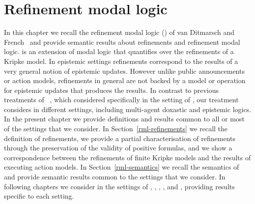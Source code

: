 \chapter{Refinement modal logic}\label{rml}

In this chapter we recall the refinement modal logic (\logicRml{}) of van Ditmarsch and French~\cite{vanditmarsch:2009} and provide semantic results about refinements and refinement modal logic.
\logicRml{} is an extension of modal logic that quantifies over the refinements of a Kripke model.
In epistemic settings refinements correspond to the results of a very general notion of epistemic updates.
However unlike public announcements or action models, refinements in general are not backed by a model or operation for epistemic updates that produces the results.  
In contrast to previous treatments of \logicRml{}~\cite{vanditmarsch:2009,vanditmarsch:2010}, which considered \logicRml{} specifically in the setting of \classK{}, our treatment considers \logicRml{} in different settings, including multi-agent doxastic and epistemic logics.
In the present chapter we provide definitions and results common to all or most of the settings that we consider.
In Section~\ref{rml-refinements} we recall the definition of refinements, we provide a partial characterisation of refinements through the preservation of the validity of positive formulas, and we show a correspondence between the refinements of finite Kripke models and the results of executing action models.
In Section~\ref{rml-semantics} we recall the semantics of \logicRml{} and provide semantic results common to the settings that we consider.
In following chapters we consider \logicRml{} in the settings of \classK{}, \classKFF{}, \classKD{}, \classS{}, and \classKF{}, providing results specific to each setting.



